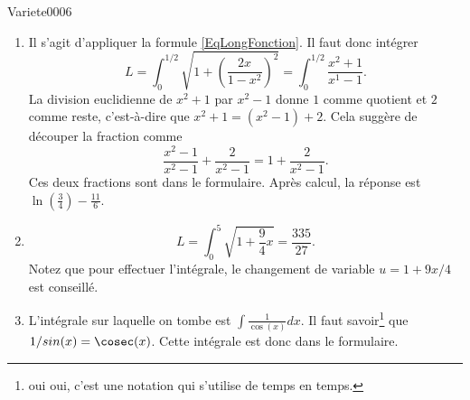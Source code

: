 
\begin{corrige}{Variete0006}

	\begin{enumerate}
		\item
			Il s'agit d'appliquer la formule \eqref{EqLongFonction}. Il faut donc intégrer
			\begin{equation}
				L=\int_0^{1/2}\sqrt{1+\left( \frac{ 2x }{ 1-x^2 } \right)^2}=\int_0^{1/2}\frac{ x^2+1 }{ x^1-1 }.
			\end{equation}
			La division euclidienne de $x^2+1$ par $x^2-1$ donne $1$ comme quotient et $2$ comme reste, c'est-à-dire que $x^2+1=(x^2-1)+2$. Cela suggère de découper la fraction comme
			\begin{equation}
				\frac{ x^2-1 }{ x^2-1 }+\frac{ 2 }{ x^2-1 }=1+\frac{ 2 }{ x^2-1 }.
			\end{equation}
			Ces deux fractions sont dans le formulaire. Après calcul, la réponse est $\ln(\frac{ 3 }{ 4 })-\frac{ 11 }{ 6 }$.

		\item
			\begin{equation}
				L=\int_0^5\sqrt{1+\frac{ 9 }{ 4 }x}=\frac{ 335 }{ 27 }.
			\end{equation}
			Notez que pour effectuer l'intégrale, le changement de variable $u=1+9x/4$ est conseillé.

		\item
			L'intégrale sur laquelle on tombe est $\int\frac{1}{ \cos(x) }dx$. Il faut savoir\footnote{oui oui, c'est une notation qui s'utilise de temps en temps.} que $1/sin(x)=\cosec(x)$. Cette intégrale est donc dans le formulaire.
			

	\end{enumerate}
	

\end{corrige}
